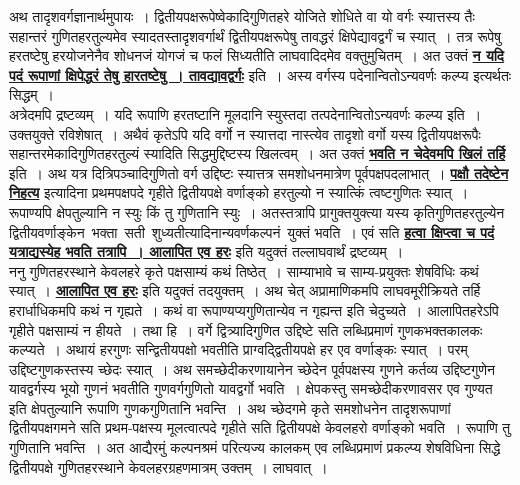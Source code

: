 \documentclass[11pt, openany]{book}
\begin{document}
\vspace{-4mm}
 अथ तादृशवर्गज्ञानार्थमुपायः~। द्वितीयपक्षरूपेष्वेकादिगुणितहरे योजिते
शोधिते 
वा यो वर्गः स्यात्तस्य तैः सहान्तरं गुणितहरतुल्यमेव
स्यादतस्तादृशवर्गार्थं द्वितीयपक्षरूपेषु तावद्धरं क्षिपेद्यावद्वर्गं च स्यात्~। तत्र रूपेषु हरतष्टेषु
हरयोजनेनैव शोधनजं योगजं 
च फलं सिध्यतीति लाघवादिदमेव वक्तुमुचितम्~। अत उक्तं \hyperref[178]{\textbf{न यदि पदं रूपाणां क्षिपेद्धरं तेषु हारतष्टेषु~। तावद्यावद्वर्गः}} इति~। अस्य वर्गस्य पदेनान्वितोऽन्यवर्णः कल्प्य इत्यर्थतः सिद्धम्~। \\

\vspace{-4mm}
 अत्रेदमपि द्रष्टव्यम्~। यदि रूपाणि हरतष्टानि मूलदानि स्युस्तदा
तत्पदेनान्वितोऽन्यवर्णः कल्प्य इति~। उक्तयुक्ते रविशेषात्~। अथैवं कृतेऽपि यदि वर्गो न स्यात्तदा नास्त्येव तादृशो वर्गो यस्य द्वितीयपक्षरूपैः
सहान्तरमेकादिगुणितहरतुल्यं स्यादिति
 सिद्धमुद्दिष्टस्य खिलत्वम्~। अत उक्तं \hyperref[178]{\textbf{भवति न चेदेवमपि खिलं तर्हि}} इति~। अथ यत्र
 दित्रिपञ्चादिगुणितो वर्ग उद्दिष्टः स्यात्तत्र समशोधनमात्रेण
पूर्वपक्षपदलाभात्~। \hyperref[115]{\textbf{पक्षौ तदेष्टेन निहत्य}} इत्यादिना प्रथमपक्षपदे गृहीते द्वितीयपक्षे वर्णाङ्को
हरतुल्यो न स्यात्किं त्वष्टगुणितः स्यात्~। रूपाण्यपि क्षेपतुल्यानि न स्युः किं तु गुणितानि
स्युः~। अतस्तत्रापि प्रागुक्तयुक्त्या यस्य कृतिगुणितहरतुल्येन \,द्वितीयवर्णाङ्केन \,भक्ता \,सती \,शुध्यतीत्यादिनान्यवर्णकल्पनं \,युक्तं भवति~। एवं सति \hyperref[178]{\textbf{हत्वा क्षिप्त्वा च पदं यत्राद्यस्येह भवति तत्रापि~। आलापित एव हरः}} इति यदुक्तं तल्लाघवार्थं द्रष्टव्यम्~।\\
\newpage
ननु गुणितहरस्थाने केवलहरे कृते पक्षसाम्यं कथं तिष्ठेत्~। साम्याभावे च
साम्य-प्रयुक्तः शेषविधिः कथं स्यात्~। \hyperref[178]{\textbf{आलापित एव हरः}} इति यदुक्तं तदयुक्तम्~। अथ
चेत् अप्रामाणिकमपि लाघवमूरीक्रियते तर्हि हरार्धाधिकमपि कथं न गृह्यते~। कथं
वा रूपाण्यप्यगुणितान्येव न गृह्यन्त इति चेदुच्यते~। आलापितहरेऽपि गृहीते
पक्षसाम्यं न हीयते~। तथा हि~। वर्गे द्वित्र्यादिगुणित उद्दिष्टे सति लब्धिप्रमाणं
गुणकभक्तकालकः कल्प्यते~। अथायं हरगुणः सन्द्वितीयपक्षो भवतीति प्राग्वद्द्वितीयपक्षे
हर एव वर्णाङ्कः स्यात्~। परम् उद्दिष्टगुणकस्तस्य च्छेदः स्यात्~। अथ
समच्छेदीकरणायानेन च्छेदेन पूर्वपक्षस्य गुणने कर्तव्य उद्दिष्टगुणेन यावद्वर्गस्य भूयो
गुणनं भवतीति गुणवर्गगुणितो
यावद्वर्गो भवति~। क्षेपकस्तु समच्छेदीकरणावसर एव गुण्यत इति
क्षेपतुल्यानि रूपाणि
गुणकगुणितानि भवन्ति~। अथ च्छेदगमे कृते समशोधनेन तादृशरूपाणां
द्वितीयपक्षगमने
सति प्रथम-पक्षस्य मूलत्वात्पदे गृहीते सति द्वितीयपक्षे केवलहरो वर्णाङ्को
भवति~। रूपाणि तु गुणितानि भवन्ति~। अत आद्यैरमुं कल्पनश्रमं परित्यज्य
कालकम् एव लब्धिप्रमाणं प्रकल्प्य शेषविधिना सिद्धे द्वितीयपक्षे
गुणितहरस्थाने केवलहरग्रहणमात्रम् उक्तम्~। लाघवात्~।\\
\end{document}

